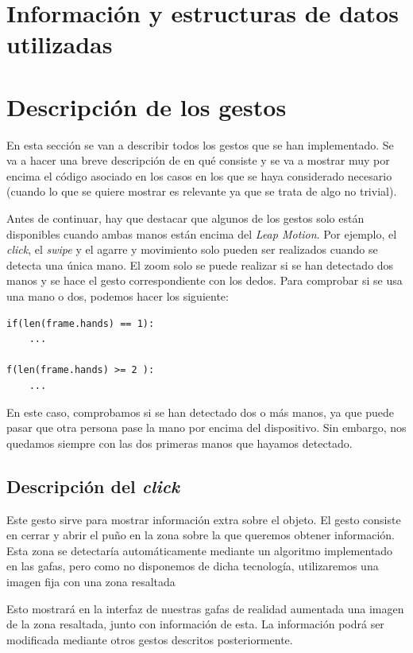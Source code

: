 \documentclass[11pt,a4paper]{article}
\begin{document}
\section{Información y estructuras de datos utilizadas}

\section{Descripción de los gestos}

En esta sección se van a describir todos los gestos que se han implementado. Se va
a hacer una breve descripción de en qué consiste y se va a mostrar muy por encima
el código asociado en los casos en los que se haya considerado necesario (cuando
lo que se quiere mostrar es relevante ya que se trata de algo no trivial).

Antes de continuar, hay que destacar que algunos de los gestos solo están disponibles
cuando ambas manos están encima del \textit{Leap Motion}. Por ejemplo, el \textit{click},
el \textit{swipe} y el agarre y movimiento solo pueden ser realizados cuando se detecta
una única mano. El zoom solo se puede realizar si se han detectado dos manos y se hace
el gesto correspondiente con los dedos. Para comprobar si se usa una mano o dos, podemos
hacer los siguiente:

\begin{lstlisting}
if(len(frame.hands) == 1):
	...

f(len(frame.hands) >= 2 ):
	...
\end{lstlisting}

En este caso, comprobamos si se han detectado dos o más manos, ya que puede pasar que
otra persona pase la mano por encima del dispositivo. Sin embargo, nos quedamos siempre
con las dos primeras manos que hayamos detectado.

\subsection{Descripción del \textit{click}}

Este gesto sirve para mostrar información extra sobre el objeto. El gesto consiste en cerrar y abrir el puño en la zona sobre la que
queremos obtener información. Esta zona se detectaría automáticamente mediante un algoritmo implementado en las gafas, pero como no disponemos
de dicha tecnología, utilizaremos una imagen fija con una zona resaltada

Esto mostrará en la interfaz de nuestras gafas de realidad aumentada una imagen de la zona resaltada, junto con información de esta. La
información podrá ser modificada mediante otros gestos descritos posteriormente.
\end{document}

